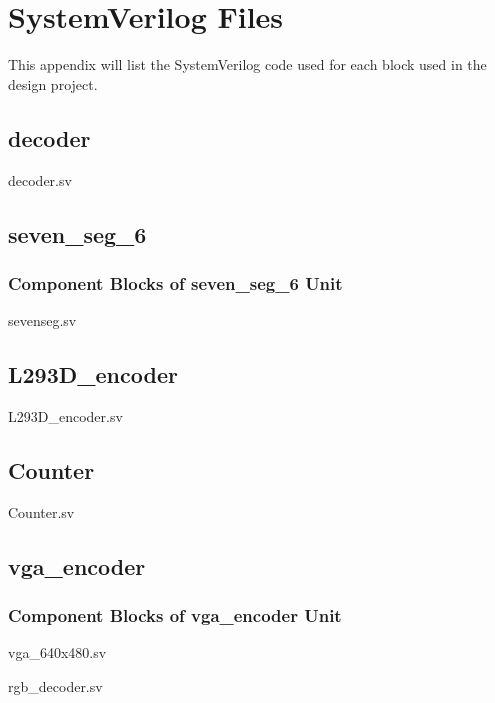\documentclass[a4paper]{article}
\begin{document}
\clearpage





\appendix
\section{SystemVerilog Files}
This appendix will list the SystemVerilog code used for each block used in the design project.

\subsection{decoder}
decoder.sv


\subsection{seven\_seg\_6}
\subsubsection{Component Blocks of seven\_seg\_6 Unit}
sevenseg.sv


\clearpage

\subsection{L293D\_encoder}
L293D\_encoder.sv


\subsection{Counter}
Counter.sv


\subsection{vga\_encoder}
\subsubsection{Component Blocks of vga\_encoder Unit}
vga\_640x480.sv


rgb\_decoder.sv

\end{document}
